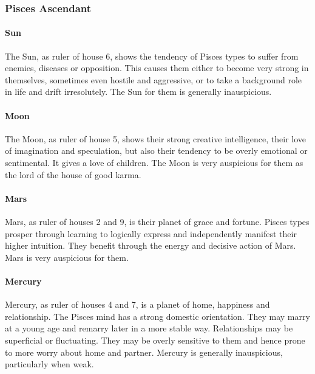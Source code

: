 \subsubsection{Pisces Ascendant}
 

\paragraph{Sun}

The Sun, as ruler of house 6, shows the tendency of Pisces types to suffer from enemies, diseases or opposition. This causes them either to become very strong in themselves, some­times even hostile and aggressive, or to take a background role in life and drift irresolutely. The Sun for them is generally inauspicious.

 

\paragraph{Moon}

The Moon, as ruler of house 5, shows their strong creative intelligence, their love of imagination and speculation, but also their tendency to be overly emotional or sentimental. It gives a love of children. The Moon is very auspicious for them as the lord of the house of good karma.

 

\paragraph{Mars}

Mars, as ruler of houses 2 and 9, is their planet of grace and fortune. Pisces types prosper through learning to logically express and independently manifest their higher intuition. They benefit through the energy and decisive action of Mars. Mars is very auspicious for them.

 

\paragraph{Mercury}

Mercury, as ruler of houses 4 and 7, is a planet of home, happiness and relationship. The Pisces mind has a strong domestic orientation. They may marry at a young age and remarry later in a more stable way. Relation­ships may be superficial or fluctuating. They may be overly sensitive to them and hence prone to more worry about home and partner. Mercury is generally inauspicious, particularly when weak.

